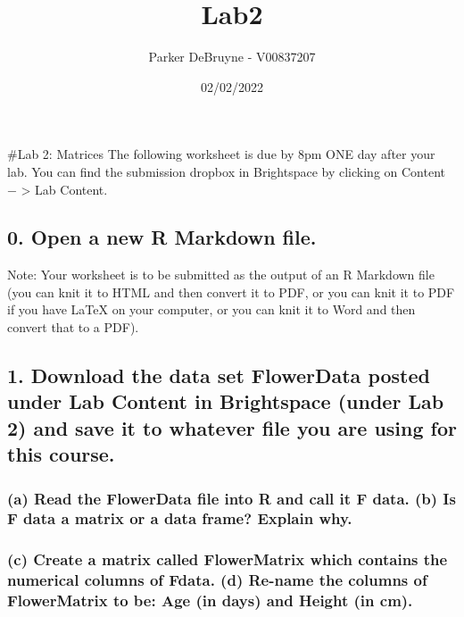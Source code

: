 \documentclass[
]{article}
\title{Lab2}
\author{Parker DeBruyne - V00837207}
\date{02/02/2022}
\begin{document}
\maketitle

\#Lab 2: Matrices The following worksheet is due by 8pm ONE day after
your lab. You can find the submission dropbox in Brightspace by clicking
on Content − \textgreater{} Lab Content.

\hypertarget{open-a-new-r-markdown-file.}{%
\subsection{0. Open a new R Markdown
file.}\label{open-a-new-r-markdown-file.}}

Note: Your worksheet is to be submitted as the output of an R Markdown
file (you can knit it to HTML and then convert it to PDF, or you can
knit it to PDF if you have LaTeX on your computer, or you can knit it to
Word and then convert that to a PDF).

\hypertarget{download-the-data-set-flowerdata-posted-under-lab-content-in-brightspace-under-lab-2-and-save-it-to-whatever-file-you-are-using-for-this-course.}{%
\subsection{1. Download the data set FlowerData posted under Lab Content
in Brightspace (under Lab 2) and save it to whatever file you are using
for this
course.}\label{download-the-data-set-flowerdata-posted-under-lab-content-in-brightspace-under-lab-2-and-save-it-to-whatever-file-you-are-using-for-this-course.}}

\hypertarget{a-read-the-flowerdata-file-into-r-and-call-it-f-data.-b-is-f-data-a-matrix-or-a-data-frame-explain-why.}{%
\subsubsection{(a) Read the FlowerData file into R and call it F data.
(b) Is F data a matrix or a data frame? Explain
why.}\label{a-read-the-flowerdata-file-into-r-and-call-it-f-data.-b-is-f-data-a-matrix-or-a-data-frame-explain-why.}}

\hypertarget{c-create-a-matrix-called-flowermatrix-which-contains-the-numerical-columns-of-fdata.-d-re-name-the-columns-of-flowermatrix-to-be-age-in-days-and-height-in-cm.}{%
\subsubsection{(c) Create a matrix called FlowerMatrix which contains
the numerical columns of Fdata. (d) Re-name the columns of FlowerMatrix
to be: Age (in days) and Height (in
cm).}\label{c-create-a-matrix-called-flowermatrix-which-contains-the-numerical-columns-of-fdata.-d-re-name-the-columns-of-flowermatrix-to-be-age-in-days-and-height-in-cm.}}
\end{document}
